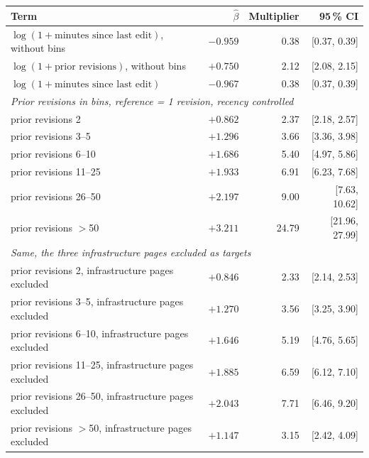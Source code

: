 \begin{tabular}{lrrr}
\toprule
Term & $\hat\beta$ & Multiplier & 95\,\% CI \\
\midrule
$\log(1+\text{minutes since last edit})$, without bins & $-0.959$ & 0.38 & [0.37, 0.39] \\
$\log(1+\text{prior revisions})$, without bins & $+0.750$ & 2.12 & [2.08, 2.15] \\
$\log(1+\text{minutes since last edit})$ & $-0.967$ & 0.38 & [0.37, 0.39] \\
\midrule \multicolumn{4}{l}{\emph{Prior revisions in bins, reference = 1 revision, recency controlled}} \\
prior revisions 2 & $+0.862$ & 2.37 & [2.18, 2.57] \\
prior revisions 3--5 & $+1.296$ & 3.66 & [3.36, 3.98] \\
prior revisions 6--10 & $+1.686$ & 5.40 & [4.97, 5.86] \\
prior revisions 11--25 & $+1.933$ & 6.91 & [6.23, 7.68] \\
prior revisions 26--50 & $+2.197$ & 9.00 & [7.63, 10.62] \\
prior revisions $>$50 & $+3.211$ & 24.79 & [21.96, 27.99] \\
\midrule \multicolumn{4}{l}{\emph{Same, the three infrastructure pages excluded as targets}} \\
prior revisions 2, infrastructure pages excluded & $+0.846$ & 2.33 & [2.14, 2.53] \\
prior revisions 3--5, infrastructure pages excluded & $+1.270$ & 3.56 & [3.25, 3.90] \\
prior revisions 6--10, infrastructure pages excluded & $+1.646$ & 5.19 & [4.76, 5.65] \\
prior revisions 11--25, infrastructure pages excluded & $+1.885$ & 6.59 & [6.12, 7.10] \\
prior revisions 26--50, infrastructure pages excluded & $+2.043$ & 7.71 & [6.46, 9.20] \\
prior revisions $>$50, infrastructure pages excluded & $+1.147$ & 3.15 & [2.42, 4.09] \\
\bottomrule
\end{tabular}

